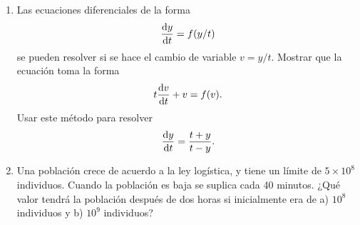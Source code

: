 \documentclass[14pt]{extarticle}
\begin{document}
\begin{enumerate}
{            \color{azul}
        }
        
        \item {
            Las ecuaciones diferenciales de la forma $$\dv{y}{t}=f(y/t)$$ se
            pueden resolver si se hace el cambio de variable $v=y/t$. Mostrar
            que la ecuación toma la forma $$t\dv{v}{t}+v=f(v).$$ Usar este
            método para resolver $$\dv{y}{t}=\frac{t+y}{t-y}.$$

            \color{azul}
        }
        
        \item {
            Una población crece de acuerdo a la ley logística, y tiene un
            límite de $5\times 10^8$ individuos. Cuando la población es baja se
            suplica cada 40 minutos. ¿Qué valor tendrá la población después de
            dos horas si inicialmente era de a) $10^8$ individuos y b) $10^9$
            individuos?

            \color{azul}
        }
    \end{enumerate}
\end{document}

